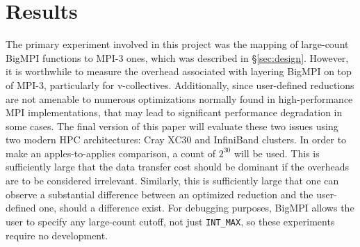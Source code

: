
\section{Results}

The primary experiment involved in this project was the
mapping of large-count BigMPI functions to MPI-3 ones,
which was described in \S\ref{sec:design}.
However, it is worthwhile to measure the overhead associated
with layering BigMPI on top of MPI-3, particularly for v-collectives.
Additionally, since user-defined reductions are not amenable to numerous
optimizations normally found in high-performance MPI implementations,
that may lead to significant performance degradation in some cases.
The final version of this paper will evaluate these two issues
using two modern HPC architectures: Cray XC30 and InfiniBand clusters.
In order to make an apples-to-applies comparison, a count
of $2^{30}$ will be used.  This is sufficiently large that the data transfer
cost should be dominant if the overheads are to be considered irrelevant.
Similarly, this is sufficiently large that one can observe a substantial difference 
between an optimized reduction and the user-defined one, should a
difference exist.
For debugging purposes, BigMPI allows the user to specify any
large-count cutoff, not just \texttt{INT\_MAX}, so these experiments
require no development.
